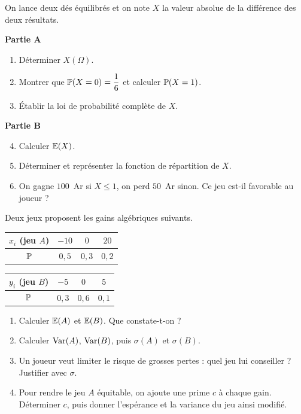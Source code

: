 On lance deux dés équilibrés et on note $X$ la valeur absolue de la
différence des deux résultats.

\textbf{Partie A}
\begin{enumerate}
	\item Déterminer $X(\Omega)$.
	\item Montrer que $\mathbb{P}(X=0)=\dfrac16$ et calculer $\mathbb{P}(X=1)$.
	\item Établir la loi de probabilité complète de $X$.
\end{enumerate}

\textbf{Partie B}
\begin{enumerate}
	\setcounter{enumi}{3}
	\item Calculer $\mathbb{E}(X)$.
	\item Déterminer et représenter la fonction de répartition de $X$.
	\item On gagne $100$~Ar si $X\leqslant 1$, on perd $50$~Ar sinon. Ce jeu
	est-il favorable au joueur ?
\end{enumerate}

Deux jeux proposent les gains algébriques suivants.
\begin{center}
	\begin{tabular}{|c|c|c|c|}
		\hline
		$x_i$ (jeu $A$) & $-10$ & $0$ & $20$ \\ \hline
		$\mathbb{P}$ & $0{,}5$ & $0{,}3$ & $0{,}2$ \\ \hline
	\end{tabular}
	\qquad
	\begin{tabular}{|c|c|c|c|}
		\hline
		$y_i$ (jeu $B$) & $-5$ & $0$ & $5$ \\ \hline
		$\mathbb{P}$ & $0{,}3$ & $0{,}6$ & $0{,}1$ \\ \hline
	\end{tabular}
\end{center}
\begin{enumerate}
	\item Calculer $\mathbb{E}(A)$ et $\mathbb{E}(B)$. Que constate-t-on ?
	\item Calculer $\mathrm{Var}(A)$, $\mathrm{Var}(B)$, puis $\sigma(A)$ et $\sigma(B)$.
	\item Un joueur veut limiter le risque de grosses pertes : quel jeu lui
	conseiller ? Justifier avec $\sigma$.
	\item Pour rendre le jeu $A$ équitable, on ajoute une prime $c$ à chaque
	gain. Déterminer $c$, puis donner l'espérance et la variance du jeu ainsi
	modifié.
\end{enumerate}

